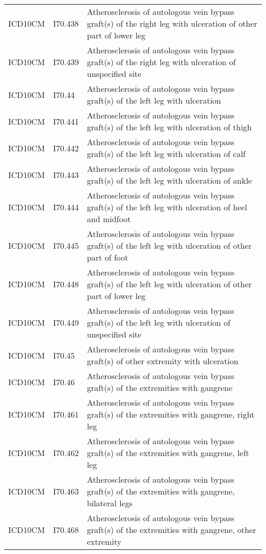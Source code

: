 \begin{longtable}{p{}p{}p{}}
  ICD10CM & I70.438 & Atherosclerosis of autologous vein bypass graft(s) of the right leg with ulceration of other part of lower leg \\ 
  ICD10CM & I70.439 & Atherosclerosis of autologous vein bypass graft(s) of the right leg with ulceration of unspecified site \\ 
  ICD10CM & I70.44 & Atherosclerosis of autologous vein bypass graft(s) of the left leg with ulceration \\ 
  ICD10CM & I70.441 & Atherosclerosis of autologous vein bypass graft(s) of the left leg with ulceration of thigh \\ 
  ICD10CM & I70.442 & Atherosclerosis of autologous vein bypass graft(s) of the left leg with ulceration of calf \\ 
  ICD10CM & I70.443 & Atherosclerosis of autologous vein bypass graft(s) of the left leg with ulceration of ankle \\ 
  ICD10CM & I70.444 & Atherosclerosis of autologous vein bypass graft(s) of the left leg with ulceration of heel and midfoot \\ 
  ICD10CM & I70.445 & Atherosclerosis of autologous vein bypass graft(s) of the left leg with ulceration of other part of foot \\ 
  ICD10CM & I70.448 & Atherosclerosis of autologous vein bypass graft(s) of the left leg with ulceration of other part of lower leg \\ 
  ICD10CM & I70.449 & Atherosclerosis of autologous vein bypass graft(s) of the left leg with ulceration of unspecified site \\ 
  ICD10CM & I70.45 & Atherosclerosis of autologous vein bypass graft(s) of other extremity with ulceration \\ 
  ICD10CM & I70.46 & Atherosclerosis of autologous vein bypass graft(s) of the extremities with gangrene \\ 
  ICD10CM & I70.461 & Atherosclerosis of autologous vein bypass graft(s) of the extremities with gangrene, right leg \\ 
  ICD10CM & I70.462 & Atherosclerosis of autologous vein bypass graft(s) of the extremities with gangrene, left leg \\ 
  ICD10CM & I70.463 & Atherosclerosis of autologous vein bypass graft(s) of the extremities with gangrene, bilateral legs \\ 
  ICD10CM & I70.468 & Atherosclerosis of autologous vein bypass graft(s) of the extremities with gangrene, other extremity \\ 

\end{longtable}
